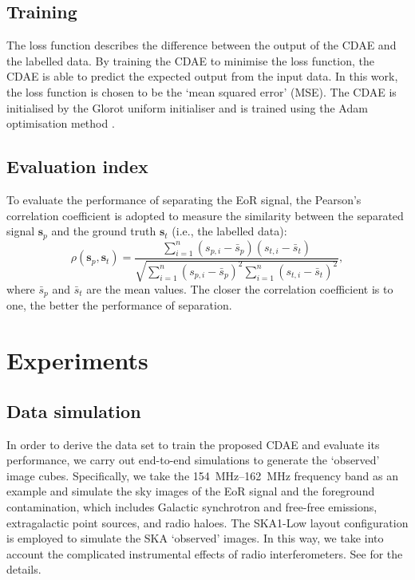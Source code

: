 \documentclass[letters,a4paper,fleqn,usenatbib]{mnras}
\begin{document}
\subsection{Training}
\label{sec:training}

The loss function describes the difference between the output of the
CDAE and the labelled data.
By training the CDAE to minimise the loss function, the CDAE is able
to predict the expected output from the input data.
In this work, the loss function is chosen to be the
`mean squared error' (MSE).
The CDAE is initialised by the Glorot uniform initialiser \citep{glorot2010}
and is trained using the Adam optimisation method \citep{kingma2015}.


\subsection{Evaluation index}
\label{sec:index}

To evaluate the performance of separating the EoR signal, the Pearson's
correlation coefficient is adopted to measure the similarity between
the separated signal $\mathbf{s}_p$ and the ground truth $\mathbf{s}_t$
(i.e., the labelled data):
\begin{equation}
  \label{eq:corrcoef}
  \rho(\mathbf{s}_p, \mathbf{s}_t) =
    \frac{\sum_{i=1}^{n}(s_{p,i}-\bar{s}_p)(s_{t,i}-\bar{s}_t)}{
      \sqrt{\sum_{i=1}^{n}(s_{p,i}-\bar{s}_p)^2
        \sum_{i=1}^{n}(s_{t,i}-\bar{s}_t)^2}
    },
\end{equation}
where $\bar{s}_p$ and $\bar{s}_t$ are the mean values.
The closer the correlation coefficient is to one, the better the
performance of separation.


\section{Experiments}
\label{sec:experiments}

\subsection{Data simulation}
\label{sec:simulation}

In order to derive the data set to train the proposed CDAE and evaluate
its performance, we carry out end-to-end simulations to generate the
`observed' image cubes.
Specifically, we take the \SIrange{154}{162}{\MHz} frequency band as an
example and simulate the sky images of the EoR signal and the foreground
contamination, which includes Galactic synchrotron and free-free
emissions, extragalactic point sources, and radio haloes.
The SKA1-Low layout configuration is employed to simulate the SKA
`observed' images.
In this way, we take into account the complicated instrumental effects
of radio interferometers.
See \citet{li2018} for the details.
\end{document}
